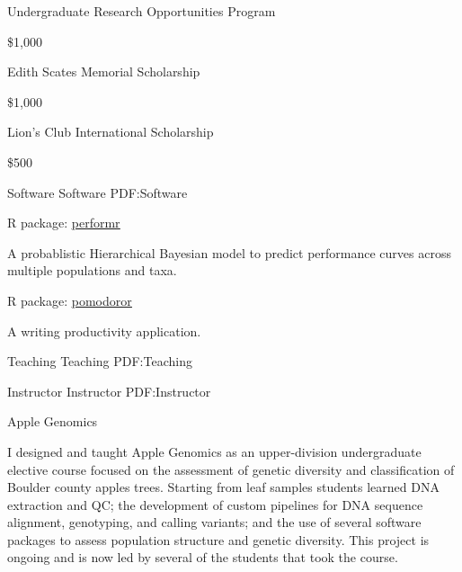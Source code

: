 \documentclass[letterpaper,MMMyyyy,nonstopmode]{simpleresumecv}
\begin{document}
\begin{Body}
{{\Gap
\BulletItem
Undergraduate Research Opportunities Program
\hfill
{}
\begin{Detail}
\Item
\$1,000
\end{Detail}


\Gap
\BulletItem
Edith Scates Memorial Scholarship
\hfill
{}
\begin{Detail}
\Item
\$1,000
\end{Detail}


\Gap
\BulletItem
Lion's Club International Scholarship
\hfill
{}
\begin{Detail}
\Item
\$500
\end{Detail}


\Section
{Software}
{Software}
{PDF:Software}

\Gap
\BulletItem
R package: \href{https://github.com/silastittes/shiny_popgen}{\underline{performr}}
\hfill
\begin{Detail}
\Item A probablistic Hierarchical Bayesian model to predict performance curves across multiple populations and taxa. 
\end{Detail}

\Gap
\BulletItem
R package: \href{https://github.com/silastittes/pomodoror}{\underline{pomodoror}}
\hfill
\begin{Detail}
\Item A writing productivity application.  
\end{Detail}



\Section
{Teaching}
{Teaching}
{PDF:Teaching}


\SubSection
{Instructor}
{Instructor}
{PDF:Instructor}

\Gap
\BulletItem
Apple Genomics
\hfill
{}
\begin{Detail}
\Item I designed and taught Apple Genomics as an upper-division undergraduate elective course focused on the assessment of genetic diversity and classification of Boulder county apples trees. Starting from leaf samples students learned DNA extraction and QC; the development of custom pipelines for DNA sequence alignment, genotyping, and calling variants; and the use of several software packages to assess population structure and genetic diversity. This project is ongoing and is now led by several of the students that took the course.
\end{Detail}

}}
\end{Body}
\end{document}
